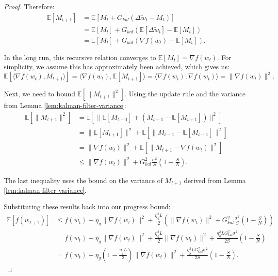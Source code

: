 \begin{proof}
    Therefore:
    \begin{align*}
        \mathbb{E}[M_{t+1}] &= \mathbb{E}[M_t + G_{kal}(\Delta \tilde{w}_t - M_t)] \\
        &= \mathbb{E}[M_t] + G_{kal}(\mathbb{E}[\Delta \tilde{w}_t] - \mathbb{E}[M_t]) \\
        &= \mathbb{E}[M_t] + G_{kal}(\nabla f(w_t) - \mathbb{E}[M_t]).
    \end{align*}
    
    In the long run, this recursive relation converges to \(\mathbb{E}[M_{t}] = \nabla f(w_t)\). For simplicity, we assume this has approximately been achieved, which gives us:
    \[
        \mathbb{E}[\langle \nabla f(w_t), M_{t+1} \rangle] = \langle \nabla f(w_t), \mathbb{E}[M_{t+1}] \rangle = \langle \nabla f(w_t), \nabla f(w_t) \rangle = \|\nabla f(w_t)\|^2.
    \]
    
    Next, we need to bound \(\mathbb{E}[\|M_{t+1}\|^2]\). Using the update rule and the variance from Lemma \ref{lem:kalman-filter-variance}:
    \begin{align*}
        \mathbb{E}[\|M_{t+1}\|^2] &= \mathbb{E}[\|\mathbb{E}[M_{t+1}] + (M_{t+1} - \mathbb{E}[M_{t+1}])\|^2] \\
        &= \|\mathbb{E}[M_{t+1}]\|^2 + \mathbb{E}[\|M_{t+1} - \mathbb{E}[M_{t+1}]\|^2] \\
        &= \|\nabla f(w_t)\|^2 + \mathbb{E}[\|M_{t+1} - \nabla f(w_t)\|^2] \\
        &\leq \|\nabla f(w_t)\|^2 + G_{kal}^2 \frac{\sigma^2}{S} \left(1 - \frac{S}{N}\right).
    \end{align*}
    
    The last inequality uses the bound on the variance of \(M_{t+1}\) derived from Lemma \ref{lem:kalman-filter-variance}.
    
    Substituting these results back into our progress bound:
    \begin{align*}
        \mathbb{E}[f(w_{t+1})] &\leq f(w_t) - \eta_g \|\nabla f(w_t)\|^2 + \frac{\eta_g^2 L}{2} \left( \|\nabla f(w_t)\|^2 + G_{kal}^2 \frac{\sigma^2}{S} \left(1 - \frac{S}{N}\right) \right) \\
        &= f(w_t) - \eta_g \|\nabla f(w_t)\|^2 + \frac{\eta_g^2 L}{2} \|\nabla f(w_t)\|^2 + \frac{\eta_g^2 L G_{kal}^2 \sigma^2}{2S} \left(1 - \frac{S}{N}\right) \\
        &= f(w_t) - \eta_g \left(1 - \frac{\eta_g L}{2}\right) \|\nabla f(w_t)\|^2 + \frac{\eta_g^2 L G_{kal}^2 \sigma^2}{2S} \left(1 - \frac{S}{N}\right).
    \end{align*}
    

\end{proof}
